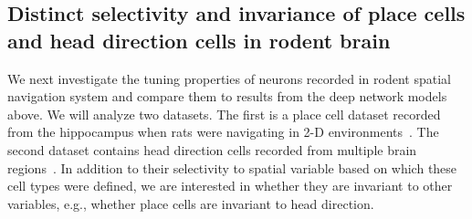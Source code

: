 \documentclass[11pt]{article}
\begin{document}







\subsection{Distinct selectivity and invariance of place cells and head direction cells in rodent brain}

We next investigate the tuning properties of neurons recorded in rodent spatial navigation system and compare them to results from the deep network models above. We will analyze two datasets. The first is a place cell dataset recorded from the hippocampus when rats were navigating in 2-D environments~\cite{pfeiffer2015}. The second dataset contains head direction cells recorded from multiple brain regions~\cite{Duszkiewicz2024local}. In addition to their selectivity to spatial variable based on which these cell types were defined, we are interested in whether they are invariant to other  variables, e.g., whether place cells are invariant to head direction. 
\end{document}
